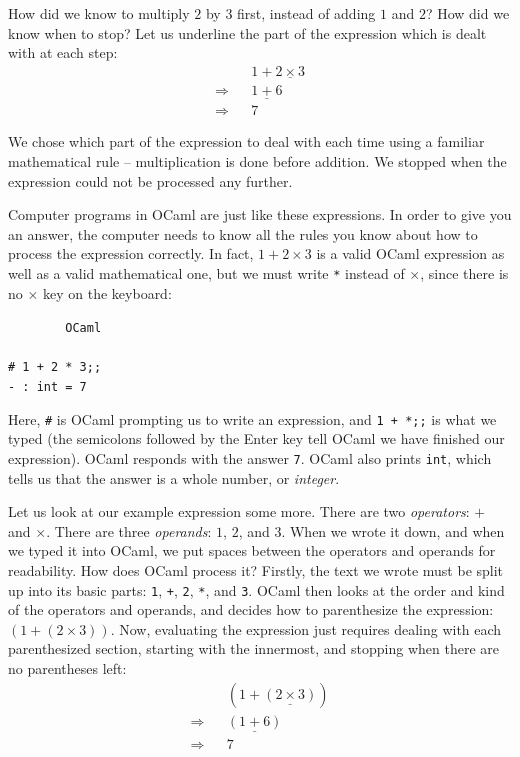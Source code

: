 \documentclass[]{book}
\newcommand{\smspace}{\vspace{4mm}}
\begin{document}
\noindent How did we know to multiply $2$ by $3$ first, instead of adding $1$ and $2$?
How did we know when to stop? Let us underline the part of the expression which is dealt with at each step:
\begin{eqnarray*}
 & & 1 + \underline{2 \times 3} \\
 \Longrightarrow & & \underline{1 + 6} \\
 \Longrightarrow & & 7
\end{eqnarray*}

\noindent We chose which part of the expression to deal with each time using a familiar
mathematical rule -- multiplication is done before addition. We stopped when the
expression could not be processed any further.

Computer programs in OCaml are just like these expressions. In order to give
you an answer, the computer needs to know all the rules you know about how to
process the expression correctly.  In fact, $1 + 2 \times 3$ is a valid OCaml
expression as well as a valid mathematical one, but we must write \verb!*! instead
of $\times$, since there is no $\times$ key on the keyboard: 

\smspace
\noindent\verb!        OCaml!\\
\noindent\\
\noindent\verb!# 1 + 2 * 3;;!\\
\noindent\verb!- : int = 7!
\smspace

\noindent Here, \verb!#! is OCaml prompting us to write an expression, and
\texttt{1\! +\! *;;} is what we typed (the semicolons followed by the Enter
key tell OCaml we have finished our expression). OCaml responds with the answer
\verb!7!. OCaml also prints \verb!int!, which tells us that the answer is a
whole number, or \textit{integer}.

Let us look at our example expression some more. There are two \textit{operators}: $+$ and $\times$. There are three \textit{operands}: $1$,
$2$, and $3$.  When we wrote it down,
and when we typed it into OCaml, we put spaces between the operators and
operands for readability. How does OCaml process it? Firstly, the text we wrote must be split up into its
basic parts: \verb!1!, \verb!+!, \verb!2!, \verb!*!, and \verb!3!. OCaml then
looks at the order and kind of the operators and operands, and decides how to
parenthesize the expression: $(1 + (2 \times 3))$. Now,  evaluating the expression
just requires dealing with each parenthesized section, starting with the innermost, and stopping when there are no parentheses left:
\begin{eqnarray*}
 & & (1 + \underline{(2 \times 3)}) \\
 \Longrightarrow & & \underline{(1 + 6)} \\
 \Longrightarrow & & 7
\end{eqnarray*}
\end{document}
